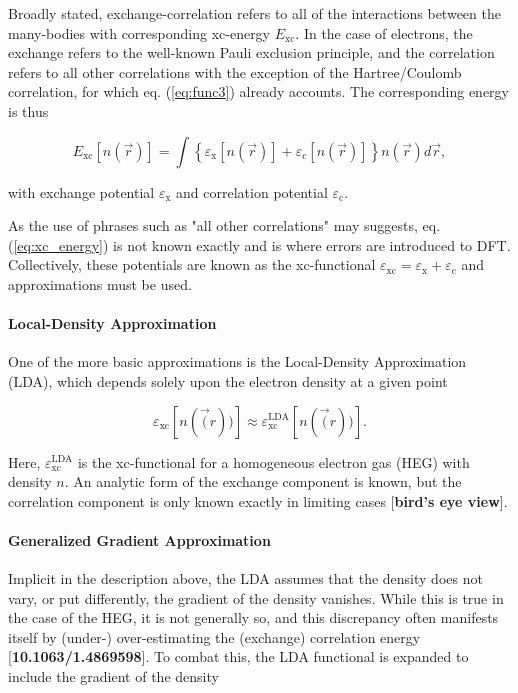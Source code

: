     Broadly stated, exchange-correlation refers to all of the interactions between the many-bodies with corresponding xc-energy $E_\text{xc}$. In the case of electrons, the exchange refers to the well-known Pauli exclusion principle, and the correlation refers to all other correlations with the exception of the Hartree/Coulomb correlation, for which eq. (\ref{eq:func3}) already accounts. The corresponding energy is thus
    
    \begin{equation}
        \label{eq:xc_energy}
        E_\text{xc}[n(\Vec{r})]= \int \left\{ \varepsilon_\text{x}[n(\Vec{r})] + \varepsilon_\text{c}[n(\Vec{r})]\right\} n(\vec{r})d\vec{r},
    \end{equation}
    
    \noindent with exchange potential $\varepsilon_\text{x}$ and correlation potential $\varepsilon_\text{c}$.
    
    As the use of phrases such as "all other correlations" may suggests, eq. (\ref{eq:xc_energy}) is not known exactly and is where errors are introduced to DFT. Collectively, these potentials are known as the xc-functional $\varepsilon_\text{xc} = \varepsilon_\text{x} + \varepsilon_\text{c}$ and approximations must be used.
    
    \paragraph{Local-Density Approximation} One of the more basic approximations is the Local-Density Approximation (LDA), which depends solely upon the electron density at a given point
    
    \begin{equation}
        \varepsilon_\text{xc}[n(\vec(r))] \approx \varepsilon_\text{xc}^\text{LDA}[n(\vec(r))].
    \end{equation}
    
    \noindent Here, $\varepsilon_\text{xc}^\text{LDA}$ is the xc-functional for a homogeneous electron gas (HEG) with density $n$. An analytic form of the exchange component is known, but the correlation component is only known exactly in limiting cases [\textbf{bird's eye view}]. 
    
    \paragraph{Generalized Gradient Approximation} Implicit in the description above, the LDA assumes that the density does not vary, or put differently, the gradient of the density vanishes. While this is true in the case of the HEG, it is not generally so, and this discrepancy often manifests itself by (under-) over-estimating the (exchange) correlation energy [\textbf{10.1063/1.4869598}]. To combat this, the LDA functional is expanded to include the gradient of the density 
    
